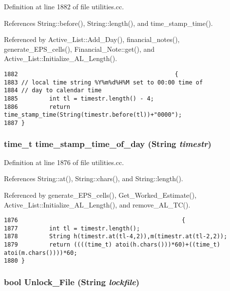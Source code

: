 Definition at line 1882 of file utilities.cc.

References String::before(), String::length(), and time\_\-stamp\_\-time().

Referenced by Active\_\-List::Add\_\-Day(), financial\_\-notes(), generate\_\-EPS\_\-cells(), Financial\_\-Note::get(), and Active\_\-List::Initialize\_\-AL\_\-Length().



\footnotesize\begin{verbatim}1882                                             {
1883 // local time string %Y%m%d%H%M set to 00:00 time of
1884 // day to calendar time
1885         int tl = timestr.length() - 4;
1886         return time_stamp_time(String(timestr.before(tl))+"0000");
1887 }
\end{verbatim}\normalsize 
{}
\subsubsection{\setlength{\rightskip}{0pt plus 5cm}time\_\-t time\_\-stamp\_\-time\_\-of\_\-day ({\bf String} {\em timestr})}\label{utilities_8cc_a24}




Definition at line 1876 of file utilities.cc.

References String::at(), String::chars(), and String::length().

Referenced by generate\_\-EPS\_\-cells(), Get\_\-Worked\_\-Estimate(), Active\_\-List::Initialize\_\-AL\_\-Length(), and remove\_\-AL\_\-TC().



\footnotesize\begin{verbatim}1876                                               {
1877         int tl = timestr.length();
1878         String h(timestr.at(tl-4,2)),m(timestr.at(tl-2,2));
1879         return ((((time_t) atoi(h.chars()))*60)+((time_t) atoi(m.chars())))*60;
1880 }
\end{verbatim}\normalsize 
{}
\subsubsection{\setlength{\rightskip}{0pt plus 5cm}bool Unlock\_\-File ({\bf String} {\em lockfile})}\label{utilities_8cc_a13}




